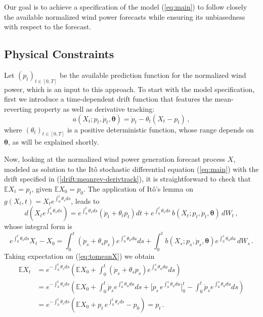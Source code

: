 \documentclass[11pt]{article}
\theoremstyle{definition}
\begin{document}
Our goal is to achieve a specification of the model (\ref{eq:main}) to follow closely the available normalized wind power forecasts while ensuring its unbiasedness with respect to the forecast. 

\subsection{Physical Constraints} \label{Physical_Constraints}

Let $(p_t)_{t \in [0,T]}$ be the available prediction function for the normalized wind power, which is an input to this approach. To start with the model specification, first we introduce a time-dependent drift function that features the mean-reverting property as well as derivative tracking:
\begin{equation}
a(X_t; p_t, \dot{p}_t, \bm{\theta}) = \dot{p}_t  - \theta_t (X_t - p_t)\,,  \label{drift:meanrev-derivtrack}
\end{equation} 
where $ (\theta_t)_{t \in [0,T]} $ is a positive deterministic function, whose range depends on $\bm{\theta}$, as will be explained shortly.

Now, looking at the normalized wind power generation forecast process $X$, modeled as solution to the It\^{o} stochastic differential equation (\ref{eq:main}) with the drift specified in (\ref{drift:meanrev-derivtrack}), it is straightforward to check that $\mathbb{E} X_t = p_t$, given $  \mathbb{E} X_0 = p_0$. The application of  It\^{o}'s lemma on $g(X_t, t) = X_t e^{\int_{0}^{t} \theta_s ds}$, leads to 
\begin{equation*}
d \left( X_t e^{\int_{0}^{t} \theta_s ds} \right) = e^{\int_{0}^{t} \theta_s ds} (\dot{p}_t + \theta_t p_t ) dt  + e^{\int_{0}^{t} \theta_s ds}\, b (X_t; p_t, \dot{p}_t, \bm{\theta} ) \,dW_t\,,
\end{equation*}
whose integral form is
\begin{equation}
e^{\int_{0}^{t} \theta_s ds}  X_t - X_0 = \int_{0}^{t}  (\dot{p}_s + \theta_s p_s ) e^{\int_{0}^{s} \theta_u du} ds + \int_{0}^{t}  b (X_s; p_s, \dot{p}_s, \bm{\theta} )  e^{\int_{0}^{s} \theta_u du}\, d W_s\,.   \label{eq:tomeanX}
\end{equation} 
Taking expectation on (\ref{eq:tomeanX}) we obtain
\begin{align}
\mathbb{E} X_t & = e^{ - \int_{0}^{t} \theta_s ds} \left(  \mathbb{E} X_0 +   \int_{0}^{t}  (\dot{p}_s + \theta_s p_s ) e^{\int_{0}^{s} \theta_u du} ds   \right) \nonumber \\ 
& =  e^{ - \int_{0}^{t} \theta_s ds} \left(  \mathbb{E} X_0 +   \int_{0}^{t}  \dot{p}_s e^{\int_{0}^{s} \theta_u du} ds +  \big[ p_s \, e^{\int_{0}^{s} \theta_u du} \big]^{t}_0  - \int_{0}^{t}  \dot{p}_s e^{\int_{0}^{s} \theta_u du} ds  \right) \nonumber \\
& =  e^{ - \int_{0}^{t} \theta_s ds} \left(  \mathbb{E} X_0 + p_t \, e^{ \int_{0}^{t} \theta_s ds} - p_0 \right) = p_t \,. \label{eq:meanX}
\end{align}
\end{document}
